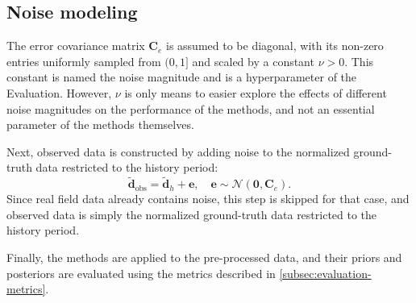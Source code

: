 \subsection{Noise modeling}
\label{subsec:noise-modeling}
%
The error covariance matrix $\mathbf{C}_e$ is assumed to be diagonal, 
with its non-zero entries uniformly sampled from $(0, 1]$ and scaled by a constant $\nu > 0$.
This constant is named the noise magnitude and is a hyperparameter of the Evaluation.
However, $\nu$ is only means to easier explore the effects of different noise magnitudes on the performance of the methods,
and not an essential parameter of the methods themselves.

Next, observed data is constructed by adding noise to the normalized ground-truth data restricted to the history period:
%
\begin{equation}
    \widetilde{\mathbf{d}}_\text{obs} = \widetilde{\mathbf{d}}_h + \mathbf{e}, \quad
    \mathbf{e} \sim \mathcal{N}(\mathbf{0}, \mathbf{C}_e).
\end{equation}
%
Since real field data already contains noise, this step is skipped for that case, 
and observed data is simply the normalized ground-truth data restricted to the history period.

Finally, the methods are applied to the pre-processed data, 
and their priors and posteriors are evaluated using the metrics described in \cref{subsec:evaluation-metrics}.

